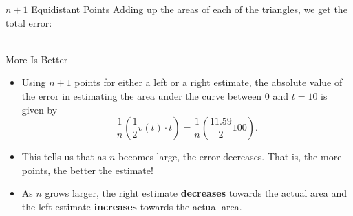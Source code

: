 \documentclass[Lecture.tex]{subfiles}
\begin{document}
\begin{frame}{$n+1$ Equidistant Points}
  Adding up the areas of each of the triangles, we get the total error:\\
  \\
\end{frame}

\begin{frame}{More Is Better}
  \begin{itemize}
  \item<1->
    Using $n+1$ points for either a left or a right estimate, the absolute value of the error in estimating the area under the curve between $0$ and $t = 10$ is given by 
    $$\frac{1}{n}\left(\frac{1}{2}v(t) \cdot t \right) = \frac{1}{n}\left(\frac{11.59}{2}100\right).$$
  \item<2->
    This tells us that as $n$ becomes large, the error decreases.
    That is, the more points, the better the estimate!
  \item<3->
    As $n$ grows larger, the right estimate {\bf decreases} towards the actual area and the left estimate {\bf increases} towards the actual area.
  \end{itemize}
\end{frame}


\end{document}
